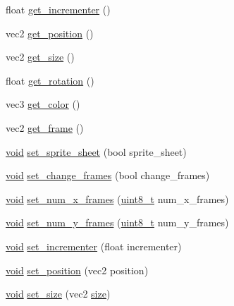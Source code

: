 \begin{DoxyCompactItemize}
\item 
float \hyperlink{classsprite_a34d638c04ee20e0640b121432a9b2bc2}{get\+\_\+incrementer} ()
\item 
vec2 \hyperlink{classsprite_acd9a248ff0bb693c614b084d5200d651}{get\+\_\+position} ()
\item 
vec2 \hyperlink{classsprite_acccf755d4af9f43b89554f7df47e0a4f}{get\+\_\+size} ()
\item 
float \hyperlink{classsprite_a7b6bbbb227a4558c7d4a0e8fc4344bca}{get\+\_\+rotation} ()
\item 
vec3 \hyperlink{classsprite_a47cf0b71c2e1f8b8df582ed341991043}{get\+\_\+color} ()
\item 
vec2 \hyperlink{classsprite_a76bc14c424cd83e145cbe056cb4a5572}{get\+\_\+frame} ()
\item 
\hyperlink{imgui__impl__opengl3__loader_8h_ac668e7cffd9e2e9cfee428b9b2f34fa7}{void} \hyperlink{classsprite_aba784f0507715f2e5a9c9eec4c84c868}{set\+\_\+sprite\+\_\+sheet} (bool sprite\+\_\+sheet)
\item 
\hyperlink{imgui__impl__opengl3__loader_8h_ac668e7cffd9e2e9cfee428b9b2f34fa7}{void} \hyperlink{classsprite_ab682d38f77706a999f53a1e62bf2539e}{set\+\_\+change\+\_\+frames} (bool change\+\_\+frames)
\item 
\hyperlink{imgui__impl__opengl3__loader_8h_ac668e7cffd9e2e9cfee428b9b2f34fa7}{void} \hyperlink{classsprite_a94abe518a02e2ef3ae690ef3d19af461}{set\+\_\+num\+\_\+x\+\_\+frames} (\hyperlink{stdint_8h_aba7bc1797add20fe3efdf37ced1182c5}{uint8\+\_\+t} num\+\_\+x\+\_\+frames)
\item 
\hyperlink{imgui__impl__opengl3__loader_8h_ac668e7cffd9e2e9cfee428b9b2f34fa7}{void} \hyperlink{classsprite_a2396292b3f5ff37fbb0851b697237248}{set\+\_\+num\+\_\+y\+\_\+frames} (\hyperlink{stdint_8h_aba7bc1797add20fe3efdf37ced1182c5}{uint8\+\_\+t} num\+\_\+y\+\_\+frames)
\item 
\hyperlink{imgui__impl__opengl3__loader_8h_ac668e7cffd9e2e9cfee428b9b2f34fa7}{void} \hyperlink{classsprite_ae3c9856eee554bf235ea32433a9cda60}{set\+\_\+incrementer} (float incrementer)
\item 
\hyperlink{imgui__impl__opengl3__loader_8h_ac668e7cffd9e2e9cfee428b9b2f34fa7}{void} \hyperlink{classsprite_ac273d4def330f6280e88eeab65d60b32}{set\+\_\+position} (vec2 position)
\item 
\hyperlink{imgui__impl__opengl3__loader_8h_ac668e7cffd9e2e9cfee428b9b2f34fa7}{void} \hyperlink{classsprite_a42ea6b6f3f0bb27ae75d136e118fdf06}{set\+\_\+size} (vec2 \hyperlink{imgui__impl__opengl3__loader_8h_a3d1e3edfcf61ca2d831883e1afbad89e}{size})

\end{DoxyCompactItemize}
